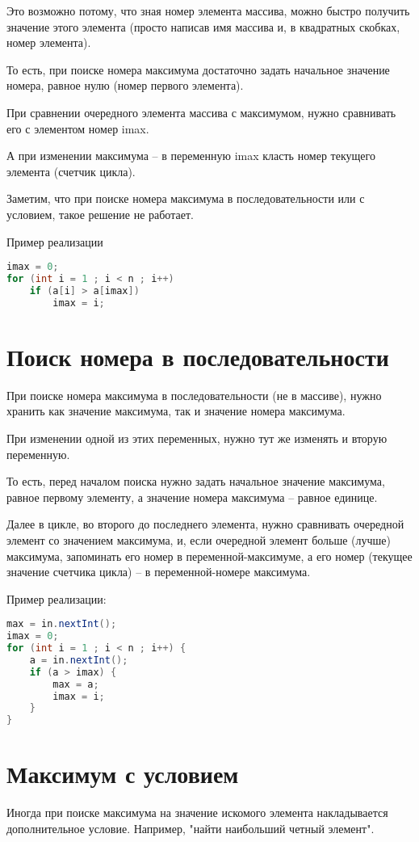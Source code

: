 \documentclass[a4paper]{article}
\begin{document}
Это возможно потому, что зная номер элемента массива, можно быстро получить значение этого элемента (просто написав имя массива и, в квадратных скобках, номер элемента).

То есть, при поиске номера максимума достаточно задать начальное значение номера, равное нулю (номер первого элемента).

При сравнении очередного элемента массива с максимумом, нужно сравнивать его с элементом номер imax.

А при изменении максимума -- в переменную imax класть номер текущего элемента (счетчик цикла).

Заметим, что при поиске номера максимума в последовательности или с условием, такое решение не работает.

Пример реализации
\begin{lstlisting}[language=Java] 
imax = 0;
for (int i = 1 ; i < n ; i++)
    if (a[i] > a[imax])
        imax = i;
\end{lstlisting} 
\section{Поиск номера в последовательности}
При поиске номера максимума в последовательности (не в массиве), нужно хранить как значение максимума, так и значение номера максимума.

При изменении одной из этих переменных, нужно тут же изменять и вторую переменную.

То есть, перед началом поиска нужно задать начальное значение максимума, равное первому элементу, а значение номера максимума -- равное единице.

Далее в цикле, во второго до последнего элемента, нужно сравнивать очередной элемент со значением максимума, и, если очередной элемент больше (лучше) максимума, запоминать его номер в переменной-максимуме, а его номер (текущее значение счетчика цикла) -- в переменной-номере максимума.

Пример реализации:
\begin{lstlisting}[language=Java] 
max = in.nextInt();
imax = 0;
for (int i = 1 ; i < n ; i++) {
    a = in.nextInt();
    if (a > imax) {
        max = a;
        imax = i;
    }
}
\end{lstlisting} 
\section{Максимум с условием}
Иногда при поиске максимума на значение искомого элемента накладывается дополнительное условие.
Например, "найти наибольший четный элемент".
\end{document}
